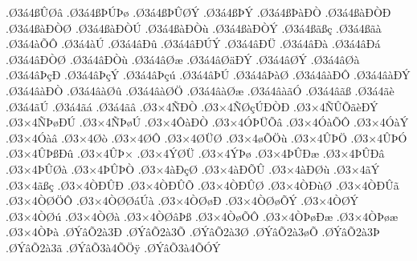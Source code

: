 {.^^d83^^e14^^df^^db^^d8^^e2
.^^d83^^e14^^df^^de^^da^^de^^f8
.^^d83^^e14^^df^^de^^db^^d8^^dd
.^^d83^^e14^^df^^de^^dd
.^^d83^^e14^^df^^de^^e0^^d0^^d2
.^^d83^^e14^^df^^e0^^d0^^d2^^d0
.^^d83^^e14^^df^^e0^^d0^^d2^^d8
.^^d83^^e14^^df^^e0^^d0^^d2^^da
.^^d83^^e14^^df^^e0^^d0^^d2^^f9
.^^d83^^e14^^df^^e0^^d0^^d2^^dd
.^^d83^^e14^^df^^e3^^df^^e7
.^^d83^^e14^^df^^e3^^e0
.^^d83^^e14^^e0^^d5^^d4
.^^d83^^e14^^e0^^da
.^^d83^^e14^^e2^^d0^^fb
.^^d83^^e14^^e2^^d0^^da^^dd
.^^d83^^e14^^e2^^d0^^dc
.^^d83^^e14^^e2^^d0^^e0
.^^d83^^e14^^e2^^d0^^e1
.^^d83^^e14^^e2^^d0^^d2^^d8
.^^d83^^e14^^e2^^d0^^d2^^f9
.^^d83^^e14^^e2^^d8^^e6
.^^d83^^e14^^e2^^d8^^e4^^d0^^dd
.^^d83^^e14^^e2^^d8^^dd
.^^d83^^e14^^e2^^d8^^e0
.^^d83^^e14^^e2^^de^^e7^^d0
.^^d83^^e14^^e2^^de^^e7^^dd
.^^d83^^e14^^e2^^de^^e7^^fa
.^^d83^^e14^^e2^^de^^da
.^^d83^^e14^^e2^^de^^e0^^d8
.^^d83^^e14^^e2^^e0^^d0^^d4
.^^d83^^e14^^e2^^e0^^d0^^dd
.^^d83^^e14^^e2^^e0^^d0^^d2
.^^d83^^e14^^e2^^e0^^d8^^fb
.^^d83^^e14^^e2^^e0^^d8^^d6
.^^d83^^e14^^e2^^e0^^d8^^e6
.^^d83^^e14^^e2^^e0^^e3^^d3
.^^d83^^e14^^e2^^e3^^df
.^^d83^^e14^^e3^^e8
.^^d83^^e14^^e3^^da
.^^d83^^e14^^e3^^e1
.^^d83^^e14^^e3^^e2
.^^d83^^d74^^d1^^d0^^d2
.^^d83^^d74^^d1^^d8^^e7^^da^^d0^^d2^^d0
.^^d83^^d74^^d1^^db^^d5^^e3^^e8^^d0^^dd
.^^d83^^d74^^d1^^de^^f8^^d0^^da
.^^d83^^d74^^d1^^de^^f8^^da
.^^d83^^d74^^d4^^e0^^d0^^d2
.^^d83^^d74^^d3^^de^^dc^^d5^^e2
.^^d83^^d74^^d3^^e0^^d5^^d4
.^^d83^^d74^^d3^^e0^^dd
.^^d83^^d74^^d3^^e0^^e2
.^^d83^^d74^^d8^^f2
.^^d83^^d74^^d8^^d4
.^^d83^^d74^^d8^^dc^^d8
.^^d83^^d74^^f8^^d5^^d6^^f9
.^^d83^^d74^^db^^de^^d6
.^^d83^^d74^^db^^de^^d3
.^^d83^^d74^^db^^de^^df^^d0^^fb
.^^d83^^d74^^db^^de^^d7
.^^d83^^d74^^dd^^d8^^dc
.^^d83^^d74^^dd^^de^^f8
.^^d83^^d74^^de^^db^^d0^^e6
.^^d83^^d74^^de^^db^^d0^^e2
.^^d83^^d74^^de^^db^^d8^^e0
.^^d83^^d74^^de^^db^^de^^d2
.^^d83^^d74^^e0^^d0^^e7^^d8
.^^d83^^d74^^e0^^d0^^d5^^db
.^^d83^^d74^^e0^^d0^^d8^^f9
.^^d83^^d74^^e3^^dd
.^^d83^^d74^^e3^^df^^e7
.^^d83^^d74^^d2^^d0^^db^^d0
.^^d83^^d74^^d2^^d0^^db^^d5
.^^d83^^d74^^d2^^d0^^db^^d8
.^^d83^^d74^^d2^^d0^^f9^^d8
.^^d83^^d74^^d2^^d0^^db^^e3
.^^d83^^d74^^d2^^d8^^d6^^d4
.^^d83^^d74^^d2^^d8^^d8^^e1^^da^^e0
.^^d83^^d74^^d2^^d8^^f8^^d0
.^^d83^^d74^^d2^^d8^^f8^^d5^^dd
.^^d83^^d74^^d2^^d8^^dd
.^^d83^^d74^^d2^^d8^^fa
.^^d83^^d74^^d2^^d8^^e0
.^^d83^^d74^^d2^^d8^^e2^^de^^df
.^^d83^^d74^^d2^^f8^^d5^^d4
.^^d83^^d74^^d2^^de^^f8^^d0^^e6
.^^d83^^d74^^d2^^de^^f8^^e6
.^^d83^^d74^^d2^^de^^e0
.^^d8^^dd^^e2^^d52^^e03^^d0
.^^d8^^dd^^e2^^d52^^e03^^d5
.^^d8^^dd^^e2^^d52^^e03^^d8
.^^d8^^dd^^e2^^d52^^e03^^f8^^d5
.^^d8^^dd^^e2^^d52^^e03^^de
.^^d8^^dd^^e2^^d52^^e03^^e3
.^^d8^^dd^^e2^^d53^^e04^^d5^^d6^^ff
.^^d8^^dd^^e2^^d53^^e04^^d5^^d3^^dd
}
